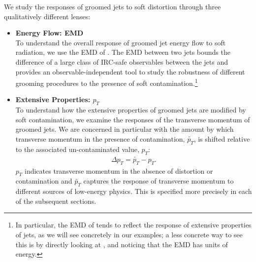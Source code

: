\documentclass[letterpaper,11pt]{article}
\begin{document}
We study the responses of groomed jets to soft distortion through three qualitatively different lenses:
\begin{itemize}
    \item \textbf{Energy Flow: EMD}
    \\
    To understand the overall response of groomed jet energy flow to soft radiation, we use the EMD of .
    The EMD between two jets bounds the difference of a large class of IRC-safe observables between the jets and provides an observable-independent tool to study the robustness of different grooming procedures to the presence of soft contamination.\footnote{
    In particular, the EMD of  tends to reflect the response of extensive properties of jets, as we will see concretely in our examples;
    a less concrete way to see this is by directly looking at , and noticing that the EMD has units of energy.
    }

    \item \textbf{Extensive Properties: \(p_T\)}
    \\
    To understand how the extensive properties of groomed jets are modified by soft contamination, we examine the responses of the transverse momentum of groomed jets.
    We are concerned in particular with the amount by which transverse momentum in the presence of contamination, \(\widetilde{p_T}\), is shifted relative to the associated un-contaminated value, \(p_T\):
    \begin{align}
        \Delta p_T = \widetilde{p_T}- p_T
        .
        \label{eqn:pt_response}
    \end{align}
   \(p_T\) indicates transverse momentum in the absence of distortion or contamination and \(\widetilde{p_T}\) captures the response of transverse momentum to different sources of low-energy physics.
   This is specified more precisely in each of the subsequent sections.


\end{itemize}
\end{document}
